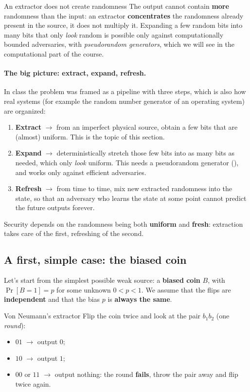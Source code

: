 \begin{framedobs}{An extractor does not create randomness}
  The output cannot contain \textbf{more} randomness than the input: an extractor \textbf{concentrates} the randomness already present in the source, it does not multiply it. Expanding a few random bits into many bits that only \textit{look} random is possible only against computationally bounded adversaries, with \textit{pseudorandom generators}, which we will see in the computational part of the course.
\end{framedobs}

\paragraph{The big picture: extract, expand, refresh.} In class the problem was framed as a pipeline with three steps, which is also how real systems (for example the random number generator of an operating system) are organized:
\begin{enumerate}
  \item \textbf{Extract} $\to$ from an imperfect physical source, obtain a few bits that are (almost) uniform. This is the topic of this section.
  \item \textbf{Expand} $\to$ deterministically stretch those few bits into as many bits as needed, which only \textit{look} uniform. This needs a pseudorandom generator (), and works only against efficient adversaries.
  \item \textbf{Refresh} $\to$ from time to time, mix new extracted randomness into the state, so that an adversary who learns the state at some point cannot predict the future outputs forever.
\end{enumerate}
Security depends on the randomness being both \textbf{uniform} and \textbf{fresh}: extraction takes care of the first, refreshing of the second.

\subsection{A first, simple case: the biased coin}

Let's start from the simplest possible weak source: a \textbf{biased coin} $B$, with $\Pr[B = 1] = p$ for some unknown $0 < p < 1$. We assume that the flips are \textbf{independent} and that the bias $p$ is \textbf{always the same}.

\begin{framedalgo}{Von Neumann's extractor}
  Flip the coin twice and look at the pair $b_1 b_2$ (one \textit{round}):
  \begin{itemize}
    \item $01$ $\to$ output $0$;
    \item $10$ $\to$ output $1$;
    \item $00$ or $11$ $\to$ output nothing: the round \textbf{fails}, throw the pair away and flip twice again.
  \end{itemize}
\end{framedalgo}


